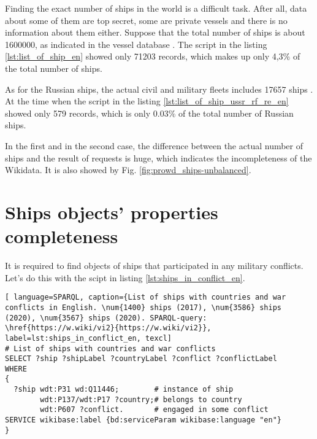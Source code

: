 Finding the exact number of ships in the world is a difficult task. After all, data about some of them are top secret, some are private vessels and there is no information about them either. Suppose that the total number of ships is about \num{1600000}, as indicated in the vessel database . The script in the listing \ref{lst:list_of_ship_en} showed only \num{71203} records, which makes up only 4,3\% of the total number of ships. 

As for the Russian ships, the actual civil and military fleets includes \num{17657} ships . At the time when the script in the listing \ref{lst:list_of_ship_ussr_rf_re_en} showed only 579 records, which is only 0.03\% of the total number of Russian ships. 

In the first and in the second case, the difference between the actual number of ships and the result of requests is huge, which indicates the incompleteness of the Wikidata. It is also showed by Fig. \ref{fig:prowd_ships-unbalanced}.


\section{Ships objects' properties completeness}

It is required to find objects of ships that participated in any military conflicts. Let's do this with the scipt in listing \ref{lst:ships_in_conflict_en}.

\begin{lstlisting}[ language=SPARQL, caption={List of ships with countries and war conflicts in English. \num{1400} ships (2017), \num{3586} ships (2020), \num{3567} ships (2020). SPARQL-query: \href{https://w.wiki/vi2}{https://w.wiki/vi2}}, label=lst:ships_in_conflict_en, texcl]
# List of ships with countries and war conflicts
SELECT ?ship ?shipLabel ?countryLabel ?conflict ?conflictLabel
WHERE
{
  ?ship wdt:P31 wd:Q11446;        # instance of ship
        wdt:P137/wdt:P17 ?country;# belongs to country
        wdt:P607 ?conflict.       # engaged in some conflict
SERVICE wikibase:label {bd:serviceParam wikibase:language "en"}
}
\end{lstlisting}


